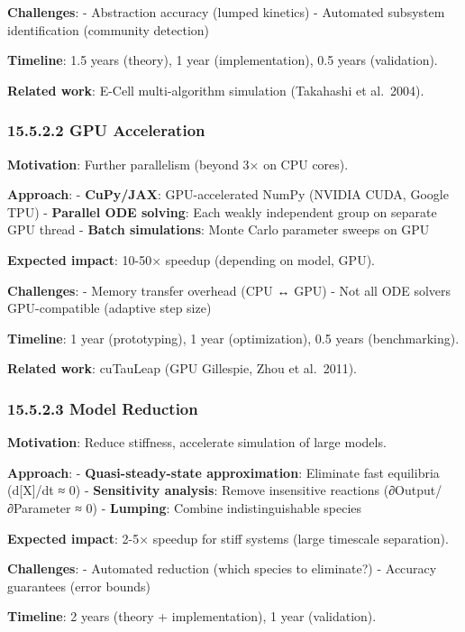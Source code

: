 \textbf{Challenges}: - Abstraction accuracy (lumped kinetics) -
Automated subsystem identification (community detection)

\textbf{Timeline}: 1.5 years (theory), 1 year (implementation), 0.5
years (validation).

\textbf{Related work}: E-Cell multi-algorithm simulation (Takahashi et
al.~2004).

\hypertarget{gpu-acceleration}{%
\subsubsection{15.5.2.2 GPU Acceleration}\label{gpu-acceleration}}

\textbf{Motivation}: Further parallelism (beyond 3× on CPU cores).

\textbf{Approach}: - \textbf{CuPy/JAX}: GPU-accelerated NumPy (NVIDIA
CUDA, Google TPU) - \textbf{Parallel ODE solving}: Each weakly
independent group on separate GPU thread - \textbf{Batch simulations}:
Monte Carlo parameter sweeps on GPU

\textbf{Expected impact}: 10-50× speedup (depending on model, GPU).

\textbf{Challenges}: - Memory transfer overhead (CPU ↔ GPU) - Not all
ODE solvers GPU-compatible (adaptive step size)

\textbf{Timeline}: 1 year (prototyping), 1 year (optimization), 0.5
years (benchmarking).

\textbf{Related work}: cuTauLeap (GPU Gillespie, Zhou et al.~2011).

\hypertarget{model-reduction}{%
\subsubsection{15.5.2.3 Model Reduction}\label{model-reduction}}

\textbf{Motivation}: Reduce stiffness, accelerate simulation of large
models.

\textbf{Approach}: - \textbf{Quasi-steady-state approximation}:
Eliminate fast equilibria (d{[}X{]}/dt ≈ 0) - \textbf{Sensitivity
analysis}: Remove insensitive reactions (∂Output/∂Parameter ≈ 0) -
\textbf{Lumping}: Combine indistinguishable species

\textbf{Expected impact}: 2-5× speedup for stiff systems (large
timescale separation).

\textbf{Challenges}: - Automated reduction (which species to eliminate?)
- Accuracy guarantees (error bounds)

\textbf{Timeline}: 2 years (theory + implementation), 1 year
(validation).

